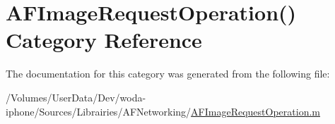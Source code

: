 \hypertarget{category_a_f_image_request_operation_07_08}{\section{A\-F\-Image\-Request\-Operation() Category Reference}
\label{category_a_f_image_request_operation_07_08}
}


The documentation for this category was generated from the following file\-:\begin{DoxyCompactItemize}
\item 
/\-Volumes/\-User\-Data/\-Dev/woda-\/iphone/\-Sources/\-Librairies/\-A\-F\-Networking/\hyperlink{_a_f_image_request_operation_8m}{A\-F\-Image\-Request\-Operation.\-m}\end{DoxyCompactItemize}
